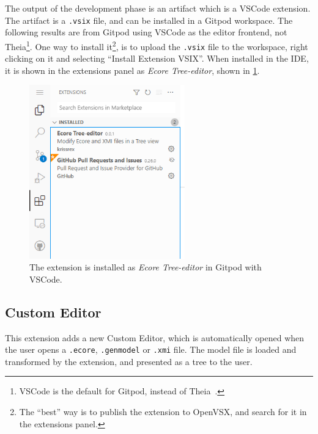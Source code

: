 The output of the development phase is an artifact which is a \gls{VSCode} extension.
The artifact is a \texttt{.vsix} file, and can be installed in a \gls{Gitpod} workspace.
The following results are from \gls{Gitpod} using \gls{VSCode} as the editor frontend, not \gls{Theia}\footnote{VSCode is the default for Gitpod, instead of Theia~\cite{georgetsiolisMenuEntryGitpod2019,svenefftingeProductRoadmapQ1}.}.
One way to install it\footnote{The ``best'' way is to publish the extension to OpenVSX, and search for it in the extensions panel.}, is to upload the \texttt{.vsix} file to the workspace, right clicking on it and selecting ``Install Extension VSIX''.
When installed in the \acrshort{IDE}, it is shown in the extensions panel as \textit{Ecore Tree-editor}, shown in \cref{fig:gitpod-ext-installed}.

\begin{figure}[H]  %
  \centering
  \includegraphics[width=0.6\textwidth]{figures/gitpod-vscode-extensions-installed.png}
  \caption[Tree Editor Extension installed in Gitpod]{The extension is installed as \textit{Ecore Tree-editor} in Gitpod with VSCode.}\label{fig:gitpod-ext-installed}
\end{figure}

\subsection{Custom Editor}

This extension adds a new Custom Editor, which is automatically opened when the user opens a \texttt{.ecore}, \texttt{.genmodel} or \texttt{.xmi} file.
The model file is loaded and transformed by the extension, and presented as a tree to the user.

